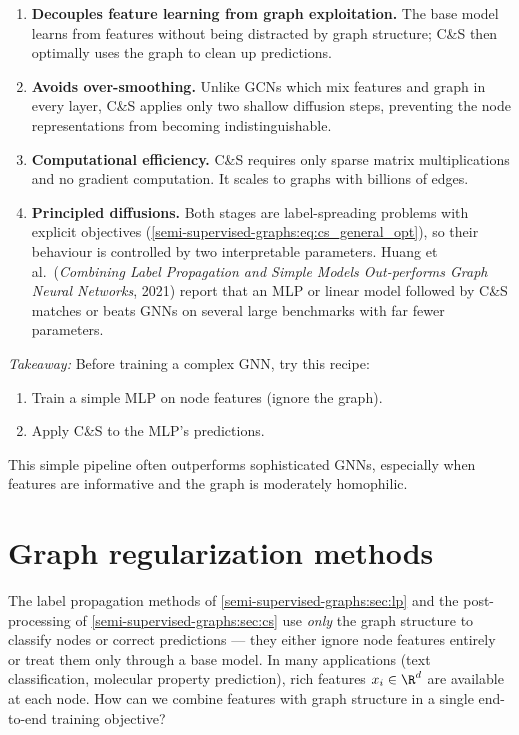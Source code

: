 \begin{notechapter}
\begin{enumerate}
    \item \textbf{Decouples feature learning from graph exploitation.}
          The base model learns from features without being distracted by graph
          structure; C\&S then optimally uses the graph to clean up predictions.
    \item \textbf{Avoids over-smoothing.} Unlike GCNs which mix features and
          graph in every layer, C\&S applies only two shallow diffusion steps,
          preventing the node representations from becoming indistinguishable.
    \item \textbf{Computational efficiency.} C\&S requires only sparse matrix
          multiplications and no gradient computation. It scales to graphs with
          billions of edges.
    \item \textbf{Principled diffusions.} Both stages are label-spreading problems with explicit objectives (\cref{semi-supervised-graphs:eq:cs_general_opt}), so their behaviour is controlled by two interpretable parameters. Huang et al.\ (\emph{Combining Label Propagation and Simple Models Out-performs Graph Neural Networks}, 2021) report that an MLP or linear model followed by C\&S matches or beats GNNs on several large benchmarks with far fewer parameters.
\end{enumerate}

\begin{intuition}
\emph{Takeaway:} Before training a complex GNN, try this recipe:
\begin{enumerate}
    \item Train a simple MLP on node features (ignore the graph).
    \item Apply C\&S to the MLP's predictions.
\end{enumerate}
This simple pipeline often outperforms sophisticated GNNs, especially when
features are informative and the graph is moderately homophilic.
\end{intuition}


\section{Graph regularization methods}
\label{semi-supervised-graphs:sec:reg}

The label propagation methods of \cref{semi-supervised-graphs:sec:lp} and the post-processing
of \cref{semi-supervised-graphs:sec:cs} use \emph{only} the graph structure to classify nodes
or correct predictions --- they either ignore node features entirely or treat
them only through a base model. In many applications (text classification,
molecular property prediction), rich features $x_i \in \R^d$ are available at
each node. How can we combine features with graph structure in a single
end-to-end training objective?


\end{notechapter}
